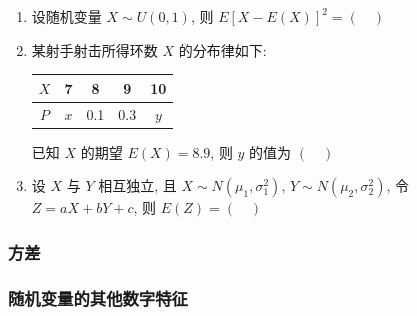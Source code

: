 \begin{enumerate}
  \item 设随机变量 $X\sim U(0,1)$, 则 $E[X-E(X)]^{2}=(\quad)$

  \item 某射手射击所得环数 $X$ 的分布律如下:
  \begin{center}
    \begin{tabular}{|c|c|c|c|c|}
      \hline
      $X$ & 7   & 8   & 9   & 10  \\
      \hline
      $P$ & $x$ & 0.1 & 0.3 & $y$ \\
      \hline
    \end{tabular}
  \end{center}
  已知 $X$ 的期望 $E(X)=8.9$, 则 $y$ 的值为 $(\quad)$

  \item 设 $X$ 与 $Y$ 相互独立, 且 $X\sim N(\mu_1,\sigma_1^{2})$, $Y\sim N(\mu_2,\sigma_2^{2})$, 令 $Z=aX+bY+c$, 则 $E(Z)=(\quad)$
\end{enumerate}


\subsubsection{方差}



\subsubsection{随机变量的其他数字特征}